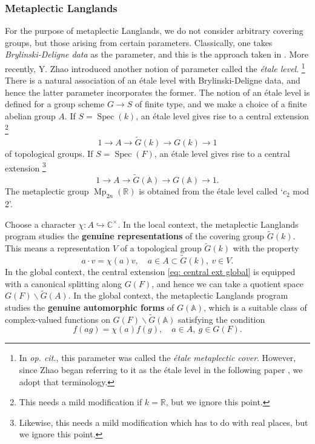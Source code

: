 \documentclass[10pt]{amsart}
\newcommand{\sssec}{\subsubsection}
\theoremstyle{remark}
\newcommand{\wt}{\widetilde}
\newcommand{\C}{\mathbb{C}}
\newcommand{\R}{\mathbb{R}}
\newcommand{\on}{\operatorname}
\DeclareMathOperator{\Spec}{Spec}
\begin{document}
\sssec{Metaplectic Langlands}
For the purpose of metaplectic Langlands, we do not consider arbitrary covering groups, but those arising from certain parameters. Classically, one takes \emph{Brylinski-Deligne data} \cite{BD} as the parameter, and this is the approach taken in \cite{GGW, Wei, GG}. More recently, Y. Zhao \cite{Zhao1} introduced another notion of parameter called the \emph{\'etale level}. \footnote{In \emph{op. cit.}, this parameter was called the \emph{\'etale metaplectic cover}. However, since Zhao began referring to it as the \'etale level in the following paper \cite{ZhaoNew}, we adopt that terminology.} There is a natural association of an \'etale level with Brylinski-Deligne data, and hence the latter parameter incorporates the former. The notion of an \'etale level is defined for a group scheme $G\rightarrow S$ of finite type, and we make a choice of a finite abelian group $A$. If $S=\Spec(k)$, an \'etale level gives rise to a central extension \footnote{This needs a mild modification if $k=\R$, but we ignore this point.}
\[1\rightarrow A\rightarrow \wt{G}(k)\rightarrow G(k)\rightarrow 1\]
of topological groups. If $S=\Spec(F)$, an \'etale level gives rise to a central extension \footnote{Likewise, this needs a mild modification which has to do with real places, but we ignore this point.}
\begin{equation}\label{eq: central ext global}
    1\rightarrow A\rightarrow \wt{G}(\mathbb{A})\rightarrow G(\mathbb{A})\rightarrow 1.
\end{equation}
The metaplectic group $\on{Mp}_{2n}(\R)$ is obtained from the \'etale level called `$c_2$ mod 2'.
\medskip

Choose a character $\chi:A\hookrightarrow \C^{\times}$. In the local context, the metaplectic Langlands program studies the \textbf{genuine representations} of the covering group $\wt{G}(k)$. This means a representation $V$ of a topological group $\wt{G}(k)$ with the property
\[a\cdot v=\chi(a)v,\quad a\in A\subset \wt{G}(k),\ v\in V.\]
In the global context, the central extension \eqref{eq: central ext global} is equipped with a canonical splitting along $G(F)$, and hence we can take a quotient space $G(F)\backslash \wt{G}(A)$. In the global context, the metaplectic Langlands program studies the \textbf{genuine automorphic forms} of $G(\mathbb{A})$, which is a suitable class of complex-valued functions on $G(F)\backslash\wt{G}(\mathbb{A})$ satisfying the condition
\begin{equation}\label{eq: genuine condition}
   f(ag)=\chi(a)f(g),\quad a\in A, \ g\in G(F). 
\end{equation}
\end{document}
